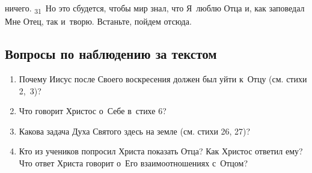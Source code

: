 \documentclass[a4paper,12pt]{article}
\begin{document}
ничего. \textsubscript{31}~Но это сбудется, чтобы мир знал, что Я~люблю Отца и, как заповедал Мне Отец, так и~творю. Встаньте, пойдем отсюда. 

\subsection*{Вопросы по наблюдению за текстом}
\begin{enumerate}
    \item Почему Иисус после Своего воскресения должен был уйти к~Отцу (см. стихи 2,~3)? 
    
    \myline
    
    \myline
    \item Что говорит Христос о~Себе в~стихе 6? 
    
    \myline
    
    \myline
    \item Какова задача Духа Святого здесь на земле (см. стихи 26, 27)? 
    
    \myline
    
    \myline
    \item Кто из учеников попросил Христа показать Отца? Как Христос ответил ему? Что ответ Христа говорит о~Его взаимоотношениях с~Отцом? 
    
    \myline
    
    \myline
\end{enumerate}
\end{document}
